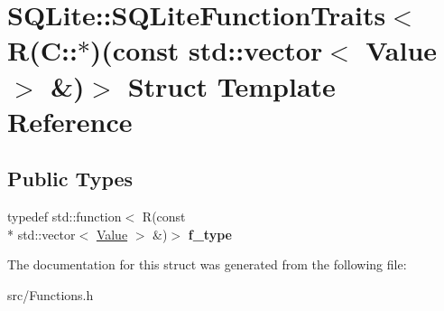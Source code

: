 \hypertarget{struct_s_q_lite_1_1_s_q_lite_function_traits_3_01_r_07_c_1_1_5_08_07const_01std_1_1vector_3_01_value_01_4_01_6_08_4}{\section{S\-Q\-Lite\-:\-:S\-Q\-Lite\-Function\-Traits$<$ R(C\-:\-:$\ast$)(const std\-:\-:vector$<$ Value $>$ \&)$>$ Struct Template Reference}
\label{struct_s_q_lite_1_1_s_q_lite_function_traits_3_01_r_07_c_1_1_5_08_07const_01std_1_1vector_3_01_value_01_4_01_6_08_4}
}
\subsection*{Public Types}
\begin{DoxyCompactItemize}
\item 
\hypertarget{struct_s_q_lite_1_1_s_q_lite_function_traits_3_01_r_07_c_1_1_5_08_07const_01std_1_1vector_3_01_value_01_4_01_6_08_4_a89300245227c9506d7bcebd54b6d4f3c}{typedef std\-::function$<$ R(const \\*
std\-::vector$<$ \hyperlink{class_s_q_lite_1_1_value}{Value} $>$ \&)$>$ {\bfseries f\-\_\-type}}\label{struct_s_q_lite_1_1_s_q_lite_function_traits_3_01_r_07_c_1_1_5_08_07const_01std_1_1vector_3_01_value_01_4_01_6_08_4_a89300245227c9506d7bcebd54b6d4f3c}

\end{DoxyCompactItemize}


The documentation for this struct was generated from the following file\-:\begin{DoxyCompactItemize}
\item 
src/Functions.\-h\end{DoxyCompactItemize}
